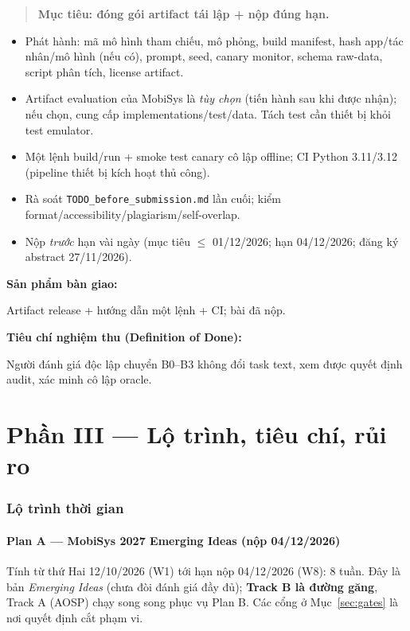 \documentclass[11pt,a4paper]{article}
\newcommand{\code}[1]{\texttt{\small #1}}
\newenvironment{phasebox}
  {\begin{quote}\color{shblue}\bfseries}
  {\end{quote}}
\newcommand{\dod}[1]{\par\vspace{0.3em}\noindent\textbf{\color{shgreen}Tiêu chí nghiệm thu (Definition of Done):}\par\vspace{0.2em}\noindent #1}
\newcommand{\deliverable}[1]{\par\vspace{0.3em}\noindent\textbf{\color{shblue}Sản phẩm bàn giao:}\par\vspace{0.2em}\noindent #1}
\begin{document}
\begin{phasebox}Mục tiêu: đóng gói artifact tái lập + nộp đúng hạn.\end{phasebox}

\begin{itemize}
  \item Phát hành: mã mô hình tham chiếu, mô phỏng, build manifest, hash app/tác nhân/mô hình (nếu có), prompt, seed, canary monitor, schema raw-data, script phân tích, license artifact.
  \item Artifact evaluation của MobiSys là \emph{tùy chọn} (tiến hành sau khi được nhận); nếu chọn, cung cấp implementations/test/data. Tách test cần thiết bị khỏi test emulator.
  \item Một lệnh build/run + smoke test canary cô lập offline; CI Python 3.11/3.12 (pipeline thiết bị kích hoạt thủ công).
  \item Rà soát \code{TODO\_before\_submission.md} lần cuối; kiểm format/accessibility/plagiarism/self-overlap.
  \item Nộp \emph{trước} hạn vài ngày (mục tiêu $\le$ 01/12/2026; hạn 04/12/2026; đăng ký abstract 27/11/2026).
\end{itemize}

\deliverable{Artifact release + hướng dẫn một lệnh + CI; bài đã nộp.}

\dod{Người đánh giá độc lập chuyển B0--B3 không đổi task text, xem được quyết định audit, xác minh cô lập oracle.}

\newpage
\part*{Phần III --- Lộ trình, tiêu chí, rủi ro}

\section{Lộ trình thời gian}

\subsection{Plan A --- MobiSys 2027 Emerging Ideas (nộp 04/12/2026)}

Tính từ thứ Hai 12/10/2026 (W1) tới hạn nộp 04/12/2026 (W8): 8 tuần. Đây là bản \emph{Emerging Ideas} (chưa đòi đánh giá đầy đủ); \textbf{Track B là đường găng}, Track A (AOSP) chạy song song phục vụ Plan B. Các cổng ở Mục~\ref{sec:gates} là nơi quyết định cắt phạm vi.
\end{document}
